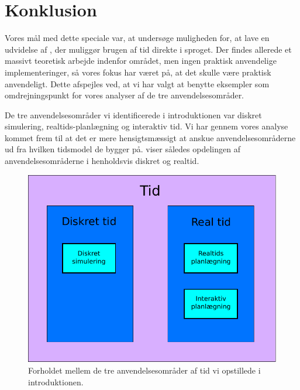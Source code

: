 \chapter{Konklusion} 
\label{chap:konklusion}

Vores mål med dette speciale var, at undersøge muligheden for, at lave en udvidelse af \pycsp, der muliggør brugen af tid direkte i sproget. Der findes allerede et massivt teoretisk arbejde indenfor området, men ingen praktisk anvendelige implementeringer, så vores fokus har været på, at det skulle være praktisk anvendeligt. Dette afspejles ved, at vi har valgt at benytte eksempler som omdrejningspunkt for vores analyser af de tre anvendelsesområder. 

De tre anvendelsesområder vi identificerede i introduktionen var diskret simulering, realtids-planlægning og interaktiv tid. Vi har gennem vores analyse kommet frem til at det er mere hensigtsmæssigt at anskue anvendelsesområderne ud fra hvilken tidsmodel de bygger på.  viser således opdelingen af anvendelsesområderne i henholdsvis diskret og realtid.

\begin{figure}[htp]
 \begin{center}
  \includegraphics[scale=0.6]{images/timemodel}
	\caption{Forholdet mellem de tre anvendelsesområder af tid vi opstillede i introduktionen.}
	\label{fig:timemodel}
\end{center}
\end{figure}

